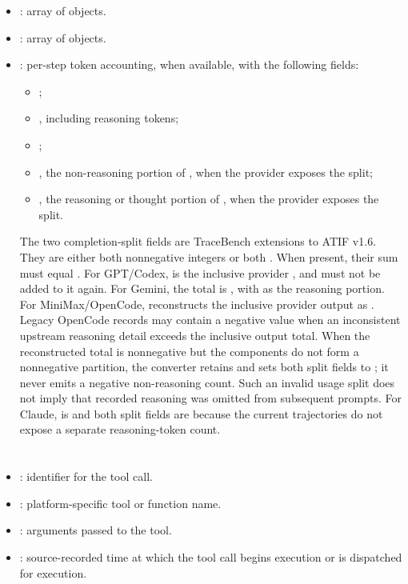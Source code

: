 \documentclass[11pt]{article}
\begin{document}
\begin{itemize}
  \item {}: array of  objects.
  \item {}: array of  objects.
  \item {}: per-step token accounting, when available, with the following fields:
    \begin{itemize}
      \item {};
      \item {}, including reasoning tokens;
      \item {};
      \item {}, the non-reasoning portion of , when the provider exposes the split;
      \item {}, the reasoning or thought portion of , when the provider exposes the split.
    \end{itemize}
  \label{metric:atif-completion-token-accounting}%
  The two completion-split fields are TraceBench extensions to ATIF v1.6.
  They are either both nonnegative integers or both .
  When present, their sum must equal .
  For GPT/Codex,  is the inclusive provider , and  must not be added to it again.
  For Gemini, the total is , with  as the reasoning portion.
  For MiniMax/OpenCode,  reconstructs the inclusive provider output as .
  Legacy OpenCode records may contain a negative  value when an inconsistent upstream reasoning detail exceeds the inclusive output total.
  When the reconstructed total is nonnegative but the components do not form a nonnegative partition, the converter retains  and sets both split fields to ; it never emits a negative non-reasoning count.
  Such an invalid usage split does not imply that recorded reasoning was omitted from subsequent prompts.
  For Claude,  is  and both split fields are  because the current trajectories do not expose a separate reasoning-token count.
\end{itemize}

\section*{\texorpdfstring{}{ToolCall Schema}}
\begin{itemize}[leftmargin=2em]
  \item {}: identifier for the tool call.
  \item {}: platform-specific tool or function name.
  \item {}: arguments passed to the tool.
  \item {}: source-recorded time at which the tool call begins execution or is dispatched for execution.
\end{itemize}
\end{document}
